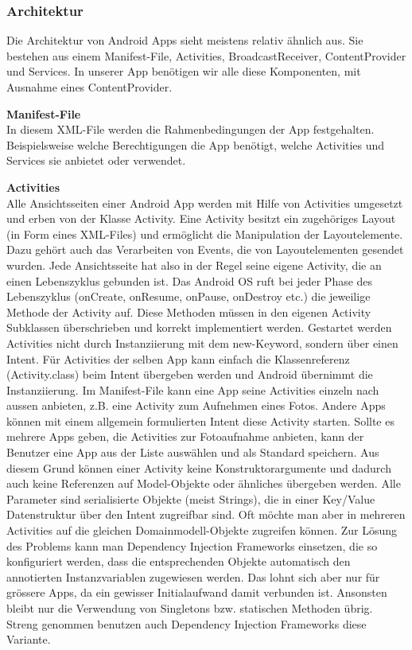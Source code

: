 \subsubsection{Architektur}
\label{sec:androidArchSolution}
Die Architektur von Android Apps sieht meistens relativ ähnlich aus. Sie bestehen aus einem Manifest-File, Activities, BroadcastReceiver, ContentProvider und Services. In unserer App benötigen wir alle diese Komponenten, mit Ausnahme eines ContentProvider.

\textbf{Manifest-File}\\
In diesem XML-File werden die Rahmenbedingungen der App festgehalten. Beispielsweise welche Berechtigungen die App benötigt, welche Activities und Services sie anbietet oder verwendet.

\textbf{Activities}\\
Alle Ansichtsseiten einer Android App werden mit Hilfe von Activities umgesetzt und erben von der Klasse Activity. Eine Activity besitzt ein zugehöriges Layout (in Form eines XML-Files) und ermöglicht die Manipulation der Layoutelemente. Dazu gehört auch das Verarbeiten von Events, die von Layoutelementen gesendet wurden. Jede Ansichtsseite hat also in der Regel seine eigene Activity, die an einen Lebenszyklus gebunden ist. Das Android OS ruft bei jeder Phase des Lebenszyklus (onCreate, onResume, onPause, onDestroy etc.) die jeweilige Methode der Activity auf. Diese Methoden müssen in den eigenen Activity Subklassen überschrieben und korrekt implementiert werden. Gestartet werden Activities nicht durch Instanziierung mit dem new-Keyword, sondern über einen Intent. Für Activities der selben App kann einfach die Klassenreferenz (Activity.class) beim Intent übergeben werden und Android übernimmt die Instanziierung. Im Manifest-File kann eine App seine Activities einzeln nach aussen anbieten, z.B. eine Activity zum Aufnehmen eines Fotos. Andere Apps können mit einem allgemein formulierten Intent diese Activity starten. Sollte es mehrere Apps geben, die Activities zur Fotoaufnahme anbieten, kann der Benutzer eine App aus der Liste auswählen und als Standard speichern. Aus diesem Grund können einer Activity keine Konstruktorargumente und dadurch auch keine Referenzen auf Model-Objekte oder ähnliches übergeben werden. Alle Parameter sind serialisierte Objekte (meist Strings), die in einer Key/Value Datenstruktur über den Intent zugreifbar sind. Oft möchte man aber in mehreren Activities auf die gleichen Domainmodell-Objekte zugreifen können. Zur Lösung des Problems kann man Dependency Injection Frameworks einsetzen, die so konfiguriert werden, dass die entsprechenden Objekte automatisch den annotierten Instanzvariablen zugewiesen werden. Das lohnt sich aber nur für grössere Apps, da ein gewisser Initialaufwand damit verbunden ist. Ansonsten bleibt nur die Verwendung von Singletons bzw. statischen Methoden übrig. Streng genommen benutzen auch Dependency Injection Frameworks diese Variante.

